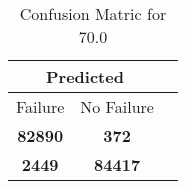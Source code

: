 \begin{table}[] 
\caption{Confusion Matric for 70.0} 
\label{Table: Prediction Accuracy-DMD70.0OnlySunEKF-ignoreReflectionEKF-top2perfectNoFailurePrediction-Reflection} 
\centering 
\begin{tabular} 
 {@{}ccc@{}} 
\toprule 
\multicolumn{2}{c}{\textbf{Predicted}}
 \\ \midrule 
\multicolumn{1}{|c|}{Failure} & 
\multicolumn{1}{c|}{No Failure}
 \\ \midrule 
\multicolumn{1}{|c|}{\color{green}\textbf{82890}} & 
\multicolumn{1}{c|}{\color{red}\textbf{372}}
 \\ \midrule 
\multicolumn{1}{|c|}{\color{red}\textbf{2449}} & 
\multicolumn{1}{c|}{\color{green}\textbf{84417}}
 \\ \bottomrule 
\end{tabular} 
\end{table} 
